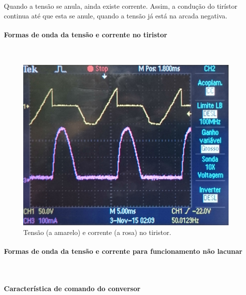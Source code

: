 \documentclass[a4paper,11pt]{article}
\numberwithin{equation}{section}
\begin{document}
Quando a tensão se anula, ainda existe corrente. Assim, a condução do tirístor continua até que esta se anule, quando a tensão já está na arcada negativa.



\paragraph{Formas de onda da tensão e corrente no tiristor} \mbox{}\

\begin{figure}[H]
	\centering
	\includegraphics[keepaspectratio=true, scale=0.15]{img/DSC_0185}
	\caption{Tensão (a amarelo) e corrente (a rosa) no tiristor.}
	\label{fig:tctiristorlacuna}
	\vspace{-0.8em}
\end{figure}

\paragraph{Formas de onda da tensão e corrente para funcionamento não lacunar} \mbox{}\

\paragraph{Característica de comando do conversor} \mbox{}\
\end{document}
